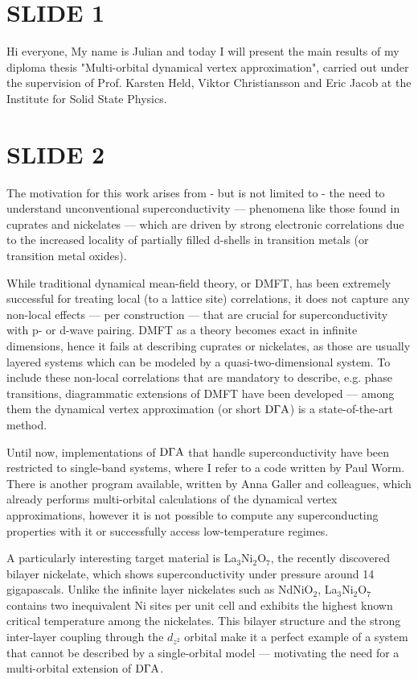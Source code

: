 \documentclass[../main.tex]{subfiles}
\begin{document}
\doublespacing

\section*{SLIDE 1}

Hi everyone,
My name is Julian and today I will present the main results of my diploma thesis "Multi-orbital dynamical vertex approximation", carried out under the supervision of Prof. Karsten Held, Viktor Christiansson and Eric Jacob at the Institute for Solid State Physics.

\section*{SLIDE 2}

The motivation for this work arises from - but is not limited to - the need to understand unconventional superconductivity --- phenomena like those found in cuprates and nickelates --- which are driven by strong electronic correlations due to the increased locality of partially filled d-shells in transition metals (or transition metal oxides).

While traditional dynamical mean-field theory, or DMFT, has been extremely successful for treating local (to a lattice site) correlations, it does not capture any non-local effects --- per construction --- that are crucial for superconductivity with p- or d-wave pairing. DMFT as a theory becomes exact in infinite dimensions, hence it fails at describing cuprates or nickelates, as those are usually layered systems which can be modeled by a quasi-two-dimensional system. To include these non-local correlations that are mandatory to describe, e.g. phase transitions, diagrammatic extensions of DMFT have been developed --- among them the dynamical vertex approximation (or short $\text{D}\Gamma\text{A}$) is a state-of-the-art method.

Until now, implementations of $\text{D}\Gamma\text{A}$ that handle superconductivity have been restricted to single-band systems, where I refer to a code written by Paul Worm. There is another program available, written by Anna Galler and colleagues, which already performs multi-orbital calculations of the dynamical vertex approximations, however it is not possible to compute any superconducting properties with it or successfully access low-temperature regimes.

A particularly interesting target material is La$_3$Ni$_2$O$_7$, the recently discovered bilayer nickelate, which shows superconductivity under pressure around 14 gigapascals. Unlike the infinite layer nickelates such as NdNiO$_2$, La$_3$Ni$_2$O$_7$ contains two inequivalent Ni sites per unit cell and exhibits the highest known critical temperature among the nickelates. This bilayer structure and the strong inter-layer coupling through the $d_{z^2}$ orbital make it a perfect example of a system that cannot be described by a single-orbital model --- motivating the need for a multi-orbital extension of $\text{D}\Gamma\text{A}$.
\end{document}
